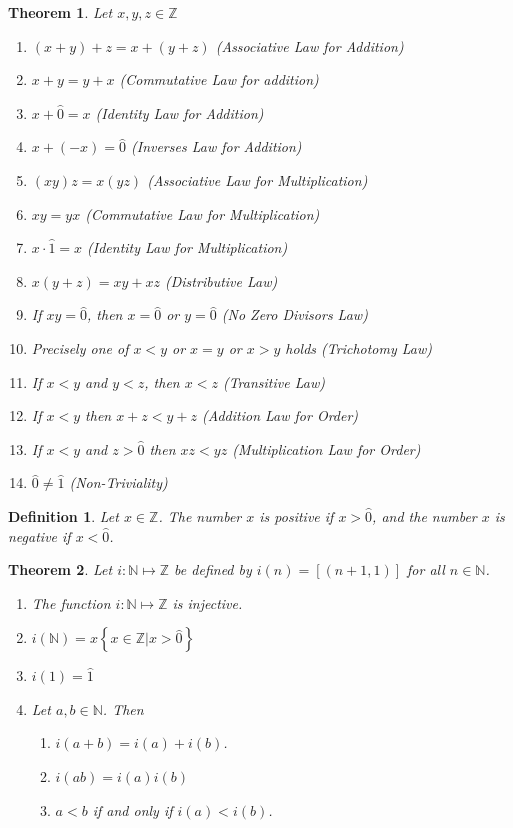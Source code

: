 \documentclass{article}
\newtheorem{theorem}{Theorem}
\newtheorem*{definition}{Definition}
\newcommand{\N}{\mathbb{N}}
\newcommand{\Z}{\mathbb{Z}}
\begin{document}
\begin{theorem}
	Let $x,y,z \in \Z$
	\begin{enumerate}
		\item $(x + y) + z = x + (y + z)$ (Associative Law for Addition)
		\item $x + y = y + x$ (Commutative Law for addition)
		\item $x + \hat{0} = x$ (Identity Law for Addition)
		\item $x + (-x) = \hat{0}$ (Inverses Law for Addition)
		\item $(xy)z = x(yz)$ (Associative Law for Multiplication)
		\item $xy = yx$ (Commutative Law for Multiplication)
		\item $x \cdot \hat{1} = x$ (Identity Law for Multiplication)
		\item $x(y + z) = xy + xz$ (Distributive Law)
		\item If $xy = \hat{0}$, then $x = \hat{0}$ or $y = \hat{0}$ (No Zero Divisors Law)
		\item Precisely one of $x < y$ or $x = y$ or $x > y$ holds (Trichotomy Law)
		\item If $x < y$ and $y < z$, then $x < z$ (Transitive Law)
		\item If $x < y$ then $x + z < y + z$ (Addition Law for Order)
		\item If $x < y$ and $z > \hat{0}$ then $xz < yz$ (Multiplication Law for Order)
		\item $\hat{0} \ne \hat{1}$ (Non-Triviality)
	\end{enumerate}
\end{theorem}

\begin{definition}
	Let $x \in \Z$. The number $x$ is positive if $x > \hat{0}$, and the number $x$ is negative if $x < \hat{0}$.
\end{definition}

\begin{theorem}
	Let $i: \N \mapsto \Z$ be defined by $i(n) = [(n + 1, 1)]$ for all $n \in \N$.
	\begin{enumerate}
		\item The function $i: \N \mapsto \Z$ is injective.
		\item $i(\N) = x \left\{ x \in \Z | x > \hat{0} \right\}$
		\item $i(1) = \hat{1}$
		\item Let $a,b \in \N$. Then 
			\begin{enumerate}
				\item[a.] $i(a + b) = i(a) + i(b)$.
				\item[b.] $i(ab) = i(a)i(b)$
				\item[c.] $a < b$ if and only if $i(a) < i(b)$.
			\end{enumerate}
	\end{enumerate}
\end{theorem}
\end{document}
